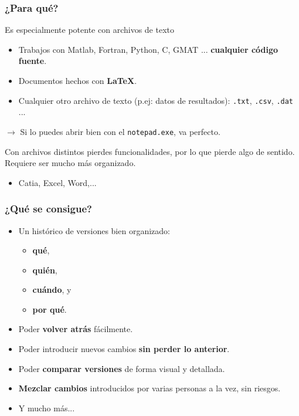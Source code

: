 \documentclass{beamer}
\begin{document}
\begin{frame}\frametitle{¿Para qué?}
	Es especialmente potente con archivos de texto
	\begin{itemize}
		\item Trabajos con Matlab, Fortran, Python, C, GMAT ... \textbf{cualquier código fuente}.
		\item Documentos hechos con \textbf{\LaTeX}.
		\item Cualquier otro archivo de texto (p.ej: datos de resultados): \texttt{.txt}, \texttt{.csv}, \texttt{.dat} ...
	\end{itemize}
	$\rightarrow$ Si lo puedes abrir bien con el \texttt{notepad.exe}, va perfecto.

	Con archivos distintos pierdes funcionalidades, por lo que pierde algo de sentido. Requiere ser mucho más organizado.
	\begin{itemize}
		\item Catia, Excel, Word,...
	\end{itemize}
\end{frame}

\begin{frame}\frametitle{¿Qué se consigue?}
	\begin{itemize}
		\item Un histórico de versiones bien organizado:%
		\begin{itemize}
			\item \textbf{qué},
			\item \textbf{quién},
			\item \textbf{cuándo}, y
			\item \textbf{por qué}.
		\end{itemize}
		\item Poder \textbf{volver atrás} fácilmente.
		\item Poder introducir nuevos cambios \textbf{sin perder lo anterior}.
		\item Poder \textbf{comparar versiones} de forma visual y detallada.
		\item \textbf{Mezclar cambios} introducidos por varias personas a la vez, sin riesgos.
		\item Y mucho más...
	\end{itemize}
\end{frame}
\end{document}
